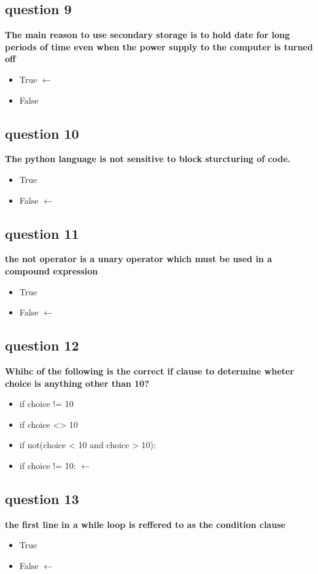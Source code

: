 \documentclass[10pt]{article}
\begin{document}
\subsection*{question 9}
\textbf{The main reason to use secondary storage is to hold date for long periods of time even when the power supply to the computer is turned off}
\begin{itemize}
\item True $\leftarrow$
\item False 
\end{itemize}
\subsection*{question 10}
\textbf{The python language is not sensitive to block sturcturing of code.}
\begin{itemize}
\item True
\item False $\leftarrow$     
\end{itemize}
\subsection*{question 11}
\textbf{the not operator is a unary operator which must be used in a compound expression}
\begin{itemize}
\item True
\item False $\leftarrow$     
\end{itemize}
\subsection*{question 12}
\textbf{Whihc of the following is the correct if clause to determine wheter choice is anything other than 10?}
\begin{itemize}
\item if choice != 10
\item if choice <> 10
\item if not(choice < 10 and choice > 10):
\item if choice != 10: $\leftarrow$
\end{itemize}
\subsection*{question 13}
\textbf{the first line in a while loop is reffered to as the condition clause}
\begin{itemize}
\item True
\item False $\leftarrow$
\end{itemize}
\end{document}
